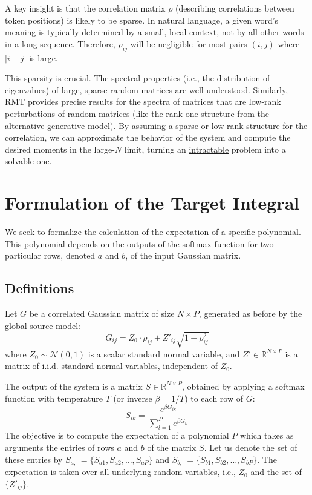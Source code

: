\documentclass[12pt]{article}
\begin{document}
A key insight is that the correlation matrix $\rho$ (describing correlations between token positions) is likely to be sparse. In natural language, a given word's meaning is typically determined by a small, local context, not by all other words in a long sequence. Therefore, $\rho_{ij}$ will be negligible for most pairs $(i,j)$ where $|i-j|$ is large.

This sparsity is crucial. The spectral properties (i.e., the distribution of eigenvalues) of large, sparse random matrices are well-understood. Similarly, RMT provides precise results for the spectra of matrices that are low-rank perturbations of random matrices (like the rank-one structure from the alternative generative model). By assuming a sparse or low-rank structure for the correlation, we can approximate the behavior of the system and compute the desired moments in the large-$N$ limit, turning an \underline{intractable} problem into a solvable one.

\section{Formulation of the Target Integral}

We seek to formalize the calculation of the expectation of a specific polynomial. This polynomial depends on the outputs of the softmax function for two particular rows, denoted $a$ and $b$, of the input Gaussian matrix.

\subsection{Definitions}
Let $G$ be a correlated Gaussian matrix of size $N \times P$, generated as before by the global source model:
\[
G_{ij} = Z_0 \cdot \rho_{ij} + Z'_{ij} \sqrt{1 - \rho_{ij}^2}
\]
where $Z_0 \sim \mathcal{N}(0,1)$ is a scalar standard normal variable, and $Z' \in \mathbb{R}^{N \times P}$ is a matrix of i.i.d. standard normal variables, independent of $Z_0$.

The output of the system is a matrix $S \in \mathbb{R}^{N \times P}$, obtained by applying a softmax function with temperature $T$ (or inverse $\beta = 1/T$) to each row of $G$:
\[
S_{ik} = \frac{e^{\beta G_{ik}}}{\sum_{l=1}^{P} e^{\beta G_{il}}}
\]
The objective is to compute the expectation of a polynomial $P$ which takes as arguments the entries of rows $a$ and $b$ of the matrix $S$. Let us denote the set of these entries by $S_{a, \cdot} = \{S_{a1}, S_{a2}, \dots, S_{aP}\}$ and $S_{b, \cdot} = \{S_{b1}, S_{b2}, \dots, S_{bP}\}$. The expectation is taken over all underlying random variables, i.e., $Z_0$ and the set of $\{Z'_{ij}\}$.
\end{document}
